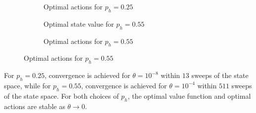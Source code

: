 \documentclass[10pt]{article}
\begin{document}
\begin{figure}[H]
\begin{subfigure}{0.45\textwidth}
 			\caption{Optimal actions for $p_h=0.25$}
 		\end{subfigure}
 		\begin{subfigure}{0.45\textwidth}
 			\caption{Optimal state value for $p_h=0.55$}
 		\end{subfigure}
 		\begin{subfigure}{0.45\textwidth}
 			\caption{Optimal actions for $p_h=0.55$}
 		\end{subfigure}
 	\end{figure}
 	For $p_h=0.25$, convergence is achieved for $\theta={10}^{-8}$ within $13$ sweeps of the state space, while for $p_h=0.55$, convergence is achieved for $\theta = {10}^{-4}$ within $511$ sweeps of the state space. For both choices of $p_h$, the optimal value function and optimal actions are stable as $\theta\rightarrow0$.
\end{document}
